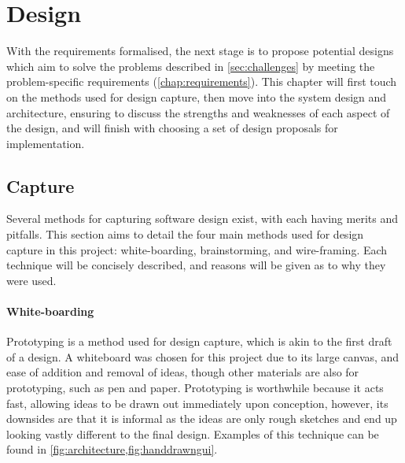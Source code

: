 
\chapter{Design}\label{chap:design}

With the requirements formalised, the next stage is to propose potential designs which aim to solve the problems described in \cref{sec:challenges} by meeting the problem-specific requirements (\cref{chap:requirements}). This chapter will first touch on the methods used for design capture, then move into the system design and architecture, ensuring to discuss the strengths and weaknesses of each aspect of the design, and will finish with choosing a set of design proposals for implementation.

\section{Capture}

Several methods for capturing software design exist, with each having merits and pitfalls. This section aims to detail the four main methods used for design capture in this project: white-boarding, brainstorming, and wire-framing. Each technique will be concisely described, and reasons will be given as to why they were used.

\subsubsection{White-boarding}
Prototyping is a method used for design capture, which is akin to the first draft of a design. A whiteboard was chosen for this project due to its large canvas, and ease of addition and removal of ideas, though other materials are also for prototyping, such as pen and paper. Prototyping is worthwhile because it acts fast, allowing ideas to be drawn out immediately upon conception, however, its downsides are that it is informal as the ideas are only rough sketches and end up looking vastly different to the final design. Examples of this technique can be found in \cref{fig:architecture,fig:handdrawngui}.

